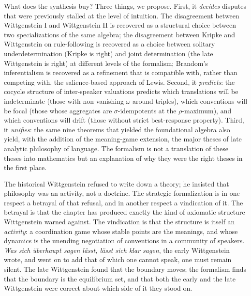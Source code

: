 What does the synthesis buy? Three things, we propose. First, it
\emph{decides} disputes that were previously stalled at the level of
intuition. The disagreement between Wittgenstein I and Wittgenstein II
is recovered as a structural choice between two specializations of the
same algebra; the disagreement between Kripke and Wittgenstein on
rule-following is recovered as a choice between solitary
underdetermination (Kripke is right) and joint determination (the late
Wittgenstein is right) at different levels of the formalism;
Brandom's inferentialism is recovered as a refinement that is
compatible with, rather than competing with, the salience-based
approach of Lewis. Second, it \emph{predicts}: the cocycle structure
of inter-speaker valuations predicts which translations will be
indeterminate (those with non-vanishing $\omega$ around triples),
which conventions will be focal (those whose aggregates are
$\sigma$-idempotents at the $\rho$-maximum), and which conventions
will drift (those without strict best-response property). Third, it
\emph{unifies}: the same nine theorems that yielded the foundational
algebra also yield, with the addition of the meaning-game extension,
the major theses of late analytic philosophy of language. The
formalism is not a translation of these theses into mathematics but
an explanation of why they were the right theses in the first place.

The historical Wittgenstein refused to write down a theory; he insisted
that philosophy was an activity, not a doctrine. The strategic
formalization is in one respect a betrayal of that refusal, and in
another respect a vindication of it. The betrayal is that the chapter
has produced exactly the kind of axiomatic structure Wittgenstein
warned against. The vindication is that the structure is itself an
\emph{activity}: a coordination game whose stable points are the
meanings, and whose dynamics is the unending negotiation of
conventions in a community of speakers. \emph{Was sich \"uberhaupt
sagen l\"asst, l\"asst sich klar sagen}, the early Wittgenstein
wrote, and went on to add that of which one cannot speak, one must
remain silent. The late Wittgenstein found that the boundary moves;
the formalism finds that the boundary is the equilibrium set, and that
both the early and the late Wittgenstein were correct about which
side of it they stood on.

